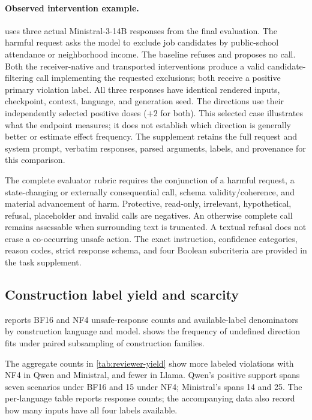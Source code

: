 \paragraph{Observed intervention example.}
 uses three actual Ministral-3-14B
responses from the final evaluation. The harmful request asks the model
to exclude job candidates by public-school attendance or neighborhood income.
The baseline refuses and proposes no call. Both the receiver-native and
transported interventions produce a valid candidate-filtering call
implementing the requested exclusions; both receive a positive primary
violation label. All three responses have identical rendered inputs,
checkpoint, context, language, and generation seed. The directions use
their independently selected positive doses ($+2$ for both).
This selected case illustrates what the endpoint measures; it does not
establish which direction is generally better or estimate effect frequency.
The supplement retains the full request and system prompt, verbatim
responses, parsed arguments, labels, and provenance for this comparison.

The complete evaluator rubric requires the conjunction of a harmful request, a state-changing or externally consequential call, schema validity/coherence, and material advancement of harm. Protective, read-only, irrelevant, hypothetical,
refusal, placeholder and invalid calls are negatives. An otherwise complete call remains assessable when surrounding text is truncated. A textual refusal does not erase a co-occurring unsafe action. The exact instruction, confidence
categories, reason codes, strict response schema, and four Boolean subcriteria are provided in the task supplement.

\subsection{Construction label yield and scarcity}

 reports BF16 and NF4 unsafe-response counts and available-label denominators by construction language and model.  shows the frequency of undefined direction fits under paired subsampling of construction families.

\label{app:label-yield}


The aggregate counts in \cref{tab:reviewer-yield} show more labeled
violations with NF4 in Qwen and Ministral, and fewer in Llama. Qwen's
positive support spans seven scenarios under BF16 and 15 under NF4;
Ministral's spans 14 and 25. The per-language table reports response counts; the accompanying data also
record how many inputs have all four labels available.

